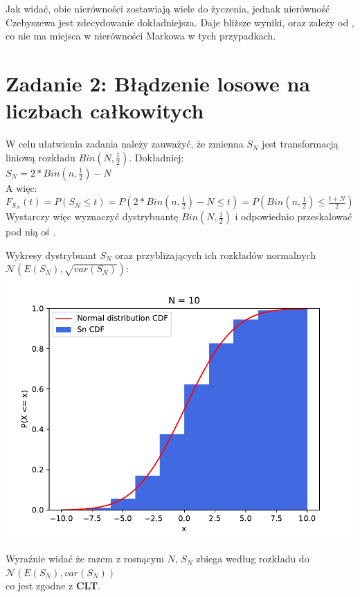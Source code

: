 \documentclass{article}
\begin{document}
Jak widać, obie nierówności zostawiają wiele do życzenia, jednak nierówność Czebyszewa jest zdecydowanie dokładniejsza.
Daje bliższe wyniki, oraz zależy od , co nie ma miejsca w nierówności Markowa w tych przypadkach.\\

\section*{Zadanie 2: Błądzenie losowe na liczbach całkowitych}

W celu ułatwienia zadania należy zauważyć, że zmienna \( S_N \) jest transformacją liniową rozkładu \( Bin\left(N, \frac{1}{2}\right) \).
Dokładniej: \\
\( S_N = 2 * Bin\left(n, \frac{1}{2}\right) - N \)\\
A więc: \\
\( F_{S_N}\left(t\right) = P\left(S_N \leq t\right) = P\left(2 * Bin\left(n, \frac{1}{2}\right) - N \leq t\right) = P\left(Bin\left(n, \frac{1}{2}\right) \leq \frac{t + N}{2}\right) \)\\
Wystarczy więc wyznaczyć dystrybuantę \( Bin\left(N, \frac{1}{2}\right) \) i odpowiednio przeskalować pod nią oś .

Wykresy dystrybuant \( S_N \) oraz przybliżających ich rozkładów normalnych \( \mathcal{N}\left(E\left(S_N\right), \sqrt{var\left(S_N\right)}\right) \):
\hspace*{-0cm} \includegraphics[scale=0.5]{./plots/exc2.pdf}

Wyraźnie widać że razem z rosnącym \( N \), \( S_N \) zbiega według rozkładu do \( \mathcal{N}\left(E\left(S_N\right), var\left(S_N\right)\right) \)\\
co jest zgodne z \textbf{CLT}. \\
\end{document}
